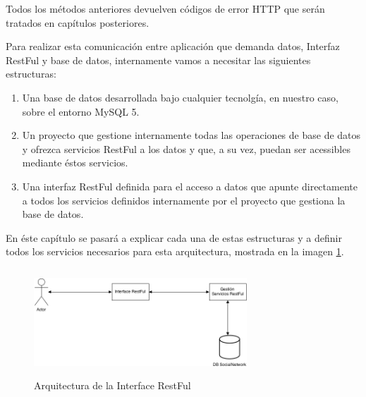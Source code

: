 Todos los métodos anteriores devuelven códigos de error HTTP que serán tratados en capítulos posteriores.
\bigskip
\par
Para realizar esta comunicación entre aplicación que demanda datos, Interfaz RestFul y base de datos, internamente vamos a necesitar las siguientes estructuras:
\begin{enumerate}
\item Una base de datos desarrollada bajo cualquier tecnolgía, en nuestro caso, sobre el entorno MySQL 5.
\item Un proyecto que gestione internamente todas las operaciones de base de datos y ofrezca servicios RestFul a los datos y que, a su vez, puedan ser acessibles mediante éstos servicios.
\item Una interfaz RestFul definida para el acceso a datos que apunte directamente a todos los servicios definidos internamente por el proyecto que gestiona la base de datos.
\end{enumerate}
\bigskip
\par
En éste capítulo se pasará a explicar cada una de estas estructuras y a definir todos los servicios necesarios para esta arquitectura, mostrada en la imagen \ref{ArqServRestFul}.
\begin{figure}
\begin{center}
\includegraphics[width=8cm,height=4cm]{Figuras/ArqServRestFul.png}
\end{center}
\caption{\label{ArqServRestFul} Arquitectura de la Interface RestFul}
\end{figure}

